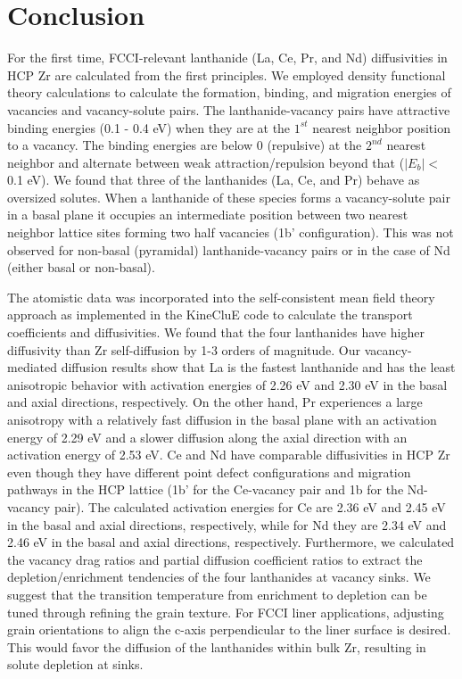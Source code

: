 \documentclass[preprint,12pt]{elsarticle}
\begin{document}
\section{Conclusion}
For the first time, FCCI-relevant lanthanide (La, Ce, Pr, and Nd) diffusivities in HCP Zr are calculated from the first principles. We employed density functional theory calculations to calculate the formation, binding, and migration energies of vacancies and vacancy-solute pairs. The lanthanide-vacancy pairs have attractive binding energies (0.1 - 0.4 eV) when they are at the $1^{st}$ nearest neighbor position to a vacancy. The binding energies are below 0 (repulsive) at the $2^{nd}$ nearest neighbor and alternate between weak attraction/repulsion beyond that ($|E_b| < $ 0.1 eV). We found that three of the lanthanides (La, Ce, and Pr) behave as oversized solutes. When a lanthanide of these species forms a vacancy-solute pair in a basal plane it occupies an intermediate position between two nearest neighbor lattice sites forming two half vacancies (1b' configuration). This was not observed for non-basal (pyramidal) lanthanide-vacancy pairs or in the case of Nd (either basal or non-basal).

The atomistic data was incorporated into the self-consistent mean field theory approach as implemented in the KineCluE code \cite{schuler_kineclue_2020} to calculate the transport coefficients and diffusivities. We found that the four lanthanides have higher diffusivity than Zr self-diffusion by 1-3 orders of magnitude. Our vacancy-mediated diffusion results show that La is the fastest lanthanide and has the least anisotropic behavior with activation energies of 2.26 eV and 2.30 eV in the basal and axial directions, respectively. On the other hand, Pr experiences a large anisotropy with a relatively fast diffusion in the basal plane with an activation energy of 2.29 eV and a slower diffusion along the axial direction with an activation energy of 2.53 eV. Ce and Nd have comparable diffusivities in HCP Zr even though they have different point defect configurations and migration pathways in the HCP lattice (1b' for the Ce-vacancy pair and 1b for the Nd-vacancy pair). The calculated activation energies for Ce are 2.36 eV and 2.45 eV in the basal and axial directions, respectively, while for Nd they are 2.34 eV and 2.46 eV in the basal and axial directions, respectively. Furthermore, we calculated the vacancy drag ratios and partial diffusion coefficient ratios to extract the depletion/enrichment tendencies of the four lanthanides at vacancy sinks. We suggest that the transition temperature from enrichment to depletion can be tuned through refining the grain texture. For FCCI liner applications, adjusting grain orientations to align the c-axis perpendicular to the liner surface is desired. This would favor the diffusion of the lanthanides within bulk Zr, resulting in solute depletion at sinks.
\end{document}
